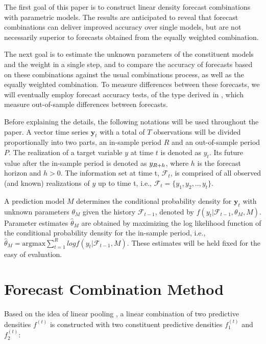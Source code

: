 \documentclass{monashthesis}
\begin{document}
The first goal of this paper is to construct linear density forecast combinations with parametric models. The results are anticipated to reveal that forecast combinations can deliver improved accuracy over single models, but are not necessarily superior to forecasts obtained from the equally weighted combination.

The next goal is to estimate the unknown parameters of the constituent models and the weight in a single step, and to compare the accuracy of forecasts based on these combinations against the usual combinations process, as well as the equally weighted combination. To measure differences between these forecasts, we will eventually employ forecast accuracy tests, of the type derived in \textcite{W96}, which measure out-of-sample differences between forecasts.

Before explaining the details, the following notations will be used throughout the paper. A vector time series \(\textbf{y}_t\) with a total of \(T\) observations will be divided proportionally into two parts, an in-sample period \(R\) and an out-of-sample period \(P\). The realization of a target variable \(y\) at time \(t\) is denoted as \(y_{t}\). Its future value after the in-sample period is denoted as \(y_{\small{R+h}}\), where \(h\) is the forecast horizon and \(h>0\). The information set at time t, \(\mathcal{F}_t\), is comprised of all observed (and known) realizations of \(y\) up to time t, i.e., \(\mathcal{F}_t = \{y_1, y_2, .., y_t\}\).

A prediction model \(M\) determines the conditional probability density for \(\textbf{y}_t\) with unknown parameters \(\theta_M\) given the history \(\mathcal{F}_{t-1}\), denoted by \(f(y_t|\mathcal{F}_{t-1}, \theta_M, M)\). Parameter estimates \(\hat\theta_M\) are obtained by maximizing the log likelihood function of the conditional probability density for the in-sample period, i.e., \(\hat\theta_M = \text{argmax} \sum^R_{t=1} log f(y_t|\mathcal{F}_{t-1}, M)\). These estimates will be held fixed for the easy of evaluation.

\hypertarget{forecast-combination-method}{%
\section{Forecast Combination Method}\label{forecast-combination-method}}

Based on the idea of linear pooling \autocite{BG69,HM07,GA11}, a linear combination of two predictive densities \(f^{(t)}\) is constructed with two constituent predictive densities \(f^{(t)}_1\) and \(f^{(t)}_2\):
\end{document}
